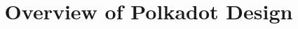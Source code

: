 \documentclass{article}
\title{Overview of Polkadot Design}
\author{}
\begin{document}
\maketitle

\begin{abstract}
\end{abstract}









\end{document}
